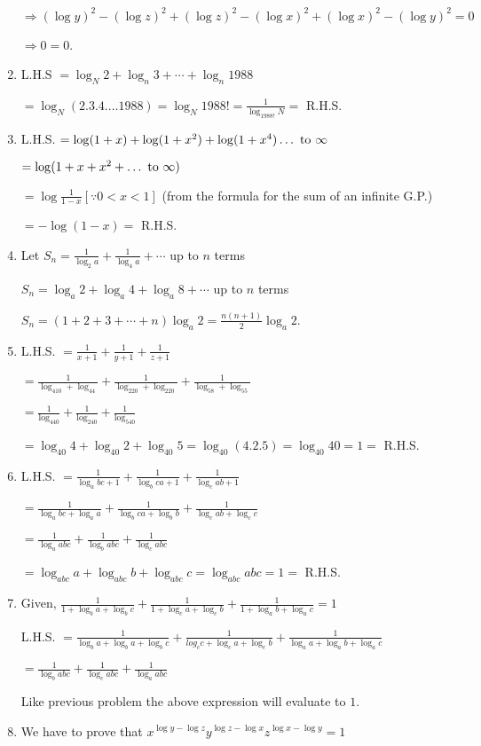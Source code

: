 \begin{enumerate}
  $\Rightarrow (\log y)^2 - (\log z)^2 + (\log z)^2 - (\log x)^2 + (\log x)^2 - (\log y)^2 = 0$

  $\Rightarrow 0 = 0$.
\item L.H.S $= \log_N2 + \log_n3 + \cdots + \log_n1988$

  $= \log_N(2.3.4.\ldots1988) = \log_N1988! = \frac{1}{\log_{1988!}N} =$ R.H.S.
\item L.H.S. $= \log(1 + x) + \log(1 + x^2) + \log(1 + x^4)\ldots~{\rm to}~\infty$

  $= \log(1 + x + x^2 + \ldots~{\rm to}~\infty)$

  $= \log\frac{1}{1 - x}[\because 0 < x < 1]$ (from the formula for the sum of an infinite G.P.)

  $= -\log(1 - x) =$ R.H.S.
\item Let $S_n = \frac{1}{\log_2a} + \frac{1}{\log_4a} + \cdots$ up to $n$ terms

  $S_n = \log_a2 + \log_a4 + \log_a8 + \cdots$ up to $n$ terms

  $S_n = (1 + 2 + 3 + \cdots + n)\log_a2 = \frac{n(n + 1)}{2}\log_a2$.
\item L.H.S. $= \frac{1}{x + 1} + \frac{1}{y + 1} + \frac{1}{z + 1}$

  $= \frac{1}{\log_410 + \log_44} + \frac{1}{\log_220 + \log_220} + \frac{1}{\log_58 + \log_55}$

  $= \frac{1}{\log_440} + \frac{1}{\log_240} + \frac{1}{\log_540}$

  $= \log_{40}4 + \log_{40}2 + \log_{40}5 = \log_{40}(4.2.5) = \log_{40}40 = 1 =$ R.H.S.
\item L.H.S. $= \frac{1}{\log_abc + 1} + \frac{1}{\log_bca + 1} + \frac{1}{\log_cab + 1}$

  $= \frac{1}{\log_abc + \log_aa} + \frac{1}{\log_bca + \log_bb} + \frac{1}{\log_cab + \log_cc}$

  $= \frac{1}{\log_aabc} + \frac{1}{\log_babc} + \frac{1}{\log_cabc}$

  $= \log_{abc}a + \log_{abc}b + \log_{abc}c = \log_{abc}abc = 1 =$ R.H.S.
\item Given, $\frac{1}{1 + \log_ba + \log_bc} + \frac{1}{1 + \log_ca + \log_cb} + \frac{1}{1 + \log_ab + \log_ac} = 1$

  L.H.S. $= \frac{1}{\log_ba + \log_ba + \log_bc} + \frac{1}{log_cc + \log_ca + \log_cb} + \frac{1}{\log_aa + \log_ab + \log_ac}$

  $= \frac{1}{\log_babc} + \frac{1}{\log_cabc} + \frac{1}{\log_aabc}$

  Like previous problem the above expression will evaluate to $1$.
\item We have to prove that $x^{\log y - \log z}y^{\log z - \log x}z^{\log x - \log y} = 1$


\end{enumerate}
